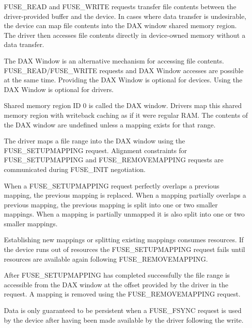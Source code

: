 FUSE\_READ and FUSE\_WRITE requests transfer file contents between the
driver-provided buffer and the device.  In cases where data transfer is
undesirable, the device can map file contents into the DAX window shared memory
region.  The driver then accesses file contents directly in device-owned memory
without a data transfer.

The DAX Window is an alternative mechanism for accessing file contents.
FUSE\_READ/FUSE\_WRITE requests and DAX Window accesses are possible at the
same time.  Providing the DAX Window is optional for devices.  Using the DAX
Window is optional for drivers.

Shared memory region ID 0 is called the DAX window.  Drivers map this shared
memory region with writeback caching as if it were regular RAM.  The contents
of the DAX window are undefined unless a mapping exists for that range.

The driver maps a file range into the DAX window using the FUSE\_SETUPMAPPING
request.  Alignment constraints for FUSE\_SETUPMAPPING and FUSE\_REMOVEMAPPING
requests are communicated during FUSE\_INIT negotiation.

When a FUSE\_SETUPMAPPING request perfectly overlaps a previous mapping, the
previous mapping is replaced.  When a mapping partially overlaps a previous
mapping, the previous mapping is split into one or two smaller mappings.  When
a mapping is partially unmapped it is also split into one or two smaller
mappings.

Establishing new mappings or splitting existing mappings consumes resources.
If the device runs out of resources the FUSE\_SETUPMAPPING request fails until
resources are available again following FUSE\_REMOVEMAPPING.

After FUSE\_SETUPMAPPING has completed successfully the file range is
accessible from the DAX window at the offset provided by the driver in the
request.  A mapping is removed using the FUSE\_REMOVEMAPPING request.

Data is only guaranteed to be persistent when a FUSE\_FSYNC request is used by
the device after having been made available by the driver following the write.


